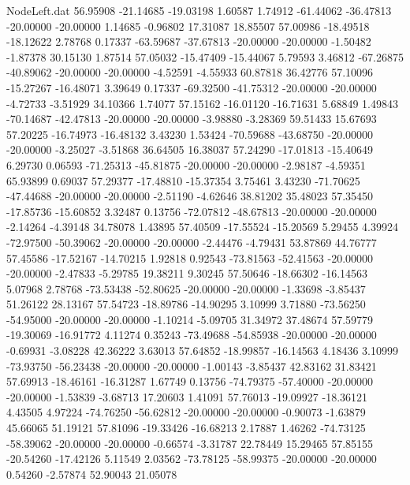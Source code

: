 \begin{filecontents}{NodeLeft.dat}
  56.95908  -21.14685  -19.03198     1.60587    1.74912  -61.44062  -36.47813  -20.00000  -20.00000    1.14685   -0.96802   17.31087   18.85507
  57.00986  -18.49518  -18.12622     2.78768    0.17337  -63.59687  -37.67813  -20.00000  -20.00000   -1.50482   -1.87378   30.15130    1.87514
  57.05032  -15.47409  -15.44067     5.79593    3.46812  -67.26875  -40.89062  -20.00000  -20.00000   -4.52591   -4.55933   60.87818   36.42776
  57.10096  -15.27267  -16.48071     3.39649    0.17337  -69.32500  -41.75312  -20.00000  -20.00000   -4.72733   -3.51929   34.10366    1.74077
  57.15162  -16.01120  -16.71631     5.68849    1.49843  -70.14687  -42.47813  -20.00000  -20.00000   -3.98880   -3.28369   59.51433   15.67693
  57.20225  -16.74973  -16.48132     3.43230    1.53424  -70.59688  -43.68750  -20.00000  -20.00000   -3.25027   -3.51868   36.64505   16.38037
  57.24290  -17.01813  -15.40649     6.29730    0.06593  -71.25313  -45.81875  -20.00000  -20.00000   -2.98187   -4.59351   65.93899    0.69037
  57.29377  -17.48810  -15.37354     3.75461    3.43230  -71.70625  -47.44688  -20.00000  -20.00000   -2.51190   -4.62646   38.81202   35.48023
  57.35450  -17.85736  -15.60852     3.32487    0.13756  -72.07812  -48.67813  -20.00000  -20.00000   -2.14264   -4.39148   34.78078    1.43895
  57.40509  -17.55524  -15.20569     5.29455    4.39924  -72.97500  -50.39062  -20.00000  -20.00000   -2.44476   -4.79431   53.87869   44.76777
  57.45586  -17.52167  -14.70215     1.92818    0.92543  -73.81563  -52.41563  -20.00000  -20.00000   -2.47833   -5.29785   19.38211    9.30245
  57.50646  -18.66302  -16.14563     5.07968    2.78768  -73.53438  -52.80625  -20.00000  -20.00000   -1.33698   -3.85437   51.26122   28.13167
  57.54723  -18.89786  -14.90295     3.10999    3.71880  -73.56250  -54.95000  -20.00000  -20.00000   -1.10214   -5.09705   31.34972   37.48674
  57.59779  -19.30069  -16.91772     4.11274    0.35243  -73.49688  -54.85938  -20.00000  -20.00000   -0.69931   -3.08228   42.36222    3.63013
  57.64852  -18.99857  -16.14563     4.18436    3.10999  -73.93750  -56.23438  -20.00000  -20.00000   -1.00143   -3.85437   42.83162   31.83421
  57.69913  -18.46161  -16.31287     1.67749    0.13756  -74.79375  -57.40000  -20.00000  -20.00000   -1.53839   -3.68713   17.20603    1.41091
  57.76013  -19.09927  -18.36121     4.43505    4.97224  -74.76250  -56.62812  -20.00000  -20.00000   -0.90073   -1.63879   45.66065   51.19121
  57.81096  -19.33426  -16.68213     2.17887    1.46262  -74.73125  -58.39062  -20.00000  -20.00000   -0.66574   -3.31787   22.78449   15.29465
  57.85155  -20.54260  -17.42126     5.11549    2.03562  -73.78125  -58.99375  -20.00000  -20.00000    0.54260   -2.57874   52.90043   21.05078

\end{filecontents}
